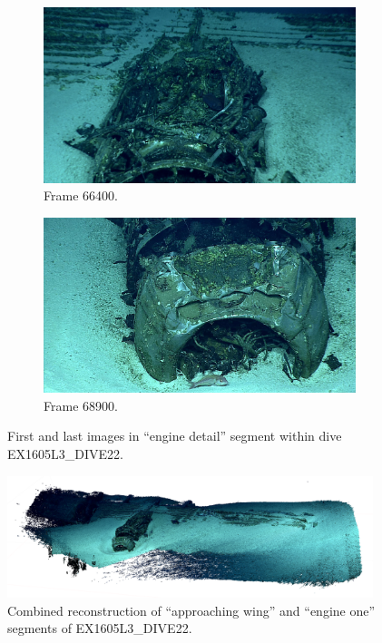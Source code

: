 \documentclass[letterpaper,12pt]{article}
\begin{document}
\begin{figure}[p]
    \centering
    \begin{subfigure}[b]{0.48\textwidth}
        \includegraphics[width=\textwidth]{images/image_066400.png}
        \caption{Frame 66400.}
        \label{fig:ex1605l3_dive22_engine_detail_begin}
    \end{subfigure}
    \begin{subfigure}[b]{0.48\textwidth}
        \includegraphics[width=\textwidth]{images/image_068900.png}
        \caption{Frame 68900.}
        \label{fig:ex1605l3_dive22_engine_detail_end}
    \end{subfigure}
    \caption{First and last images in ``engine detail'' segment within dive EX1605L3\_DIVE22.}
\end{figure}


\begin{figure}
    \centering
    \includegraphics[width=0.95\textwidth]{images/approaching_wing_photoscan.png}
    \caption{Combined reconstruction of ``approaching wing'' and ``engine one'' segments of EX1605L3\_DIVE22.}
    \label{fig:ex1605l3_dive22_wing_photoscan}
\end{figure}
\end{document}
